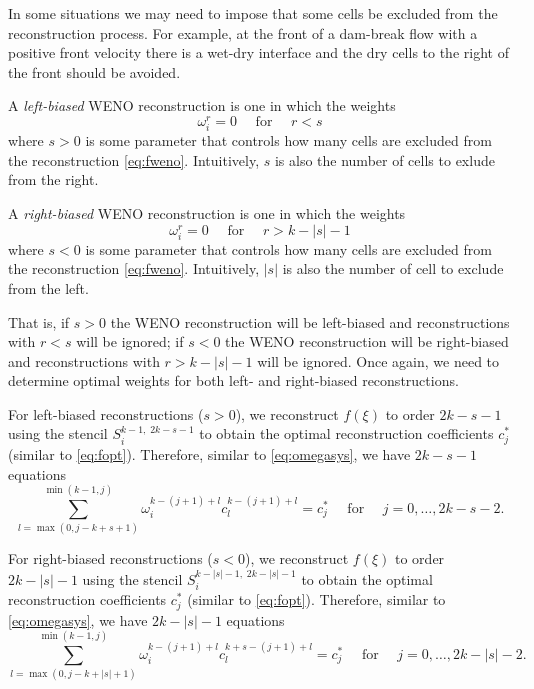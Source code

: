 \documentclass{article}
\newcommand{\for}[0]{\quad \text{ for } \quad}
\numberwithin{equation}{section}
\begin{document}
In some situations we may need to impose that some cells be excluded
from the reconstruction process.  For example, at the front of a
dam-break flow with a positive front velocity there is a wet-dry
interface and the dry cells to the right of the front should be
avoided.

A \emph{left-biased} WENO reconstruction is one in which the weights
\begin{equation*}
  \omega_i^r=0 \quad \text{ for } \quad r < s
\end{equation*}
where $s>0$ is some parameter that controls how many cells are
excluded from the reconstruction \eqref{eq:fweno}.  Intuitively, $s$
is also the number of cells to exlude from the right.

A \emph{right-biased} WENO reconstruction is one in which the weights
\begin{equation*}
  \omega_i^r=0 \quad \text{ for } \quad r > k - |s| - 1
\end{equation*}
where $s<0$ is some parameter that controls how many cells are
excluded from the reconstruction \eqref{eq:fweno}.  Intuitively, $|s|$
is also the number of cell to exclude from the left.

That is, if $s > 0$ the WENO reconstruction will be left-biased and
reconstructions with $r < s$ will be ignored; if $s<0$ the WENO
reconstruction will be right-biased and reconstructions with $r > k -
|s| - 1$ will be ignored.  Once again, we need to determine optimal
weights for both left- and right-biased reconstructions.

For left-biased reconstructions ($s > 0$), we reconstruct $f(\xi)$ to
order $2k - s - 1$ using the stencil $S_i^{k-1,\; 2k-s-1}$ to obtain the
optimal reconstruction coefficients $c^*_j$ (similar to
\eqref{eq:fopt}).  Therefore, similar to \eqref{eq:omegasys}, we have
$2k-s-1$ equations
\begin{equation}
  \label{eq:left_omegasys}
  \sum_{l=\max(0,j-k+s+1)}^{\min(k-1,j)} \omega_i^{k-(j+1)+l} c_l^{k-(j+1)+l} = c_j^*
    \for j = 0,\ldots,2k-s-2.
\end{equation}

For right-biased reconstructions ($s < 0$), we reconstruct $f(\xi)$ to
order $2k - |s| - 1$ using the stencil $S_i^{k-|s|-1,\; 2k-|s|-1}$ to obtain the
optimal reconstruction coefficients $c^*_j$ (similar to
\eqref{eq:fopt}).  Therefore, similar to \eqref{eq:omegasys}, we have
$2k-|s|-1$ equations
\begin{equation}
  \label{eq:right_omegasys}
  \sum_{l=\max(0,j-k+|s|+1)}^{\min(k-1,j)} \omega_i^{k-(j+1)+l} c_l^{k+s-(j+1)+l} = c_j^*
    \for j = 0,\ldots,2k-|s|-2.
\end{equation}
\end{document}
